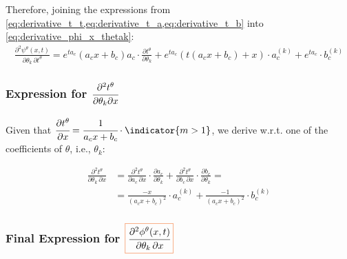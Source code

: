 Therefore, joining the expressions from \cref{eq:derivative_t_t,eq:derivative_t_a,eq:derivative_t_b} into \cref{eq:derivative_phi_x_thetak}:
\begin{equation}
\begin{aligned}
\frac{\partial^2 \psi^\theta(x,t)}{\partial \theta_k \, \partial t^\theta} =
e^{t a_c} ( a_c x + b_c) a_c \cdot \frac{\partial t^\theta}{\partial \theta_k} + 
e^{t a_c} (t(a_c x + b_c) + x) \cdot a_c^{(k)} + 
e^{t a_c}  \cdot b_c^{(k)}
\end{aligned}
\end{equation}


\subsubsection{Expression for $\cfrac{\partial^2 t^\theta}{\partial \theta_k \partial x}$}


Given that $\cfrac{\partial t^\theta}{\partial x} = \cfrac{1}{a_c x + b_c}  \cdot \indicator{m>1}$, we derive w.r.t. one of the coefficients of $\theta$, i.e., $\theta_k$:

\begin{equation}
  \begin{aligned}  
    \frac{\partial^2 t^\theta}{\partial \theta_k \, \partial x} &=
    \frac{\partial^2 t^\theta}{\partial a_c \, \partial x} \cdot \frac{\partial a_c}{\partial \theta_k} +
    \frac{\partial^2 t^\theta}{\partial b_c \, \partial x} \cdot \frac{\partial b_c}{\partial \theta_k} = \\ &=
    \frac{-x}{(a_c x + b_c)^2}\cdot a_c^{(k)} + 
    \frac{-1}{(a_c x + b_c)^2}\cdot b_c^{(k)}
\end{aligned}
\end{equation}

\subsubsection{Final Expression for $\color{Orange}\boxed{\color{black}\cfrac{\partial^2 \phi^\theta(x,t)}{\partial \theta_k \, \partial x}}$}

